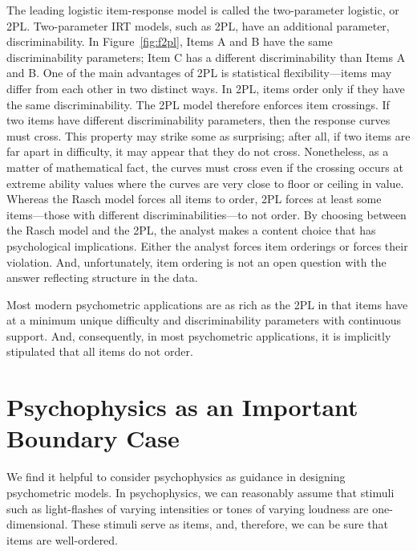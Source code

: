 \documentclass[english,,man]{apa6}
\begin{document}
The leading logistic item-response model is called the two-parameter logistic, or 2PL. Two-parameter IRT models, such as 2PL, have an additional parameter, discriminability. In Figure~\ref{fig:f2pl}, Items A and B have the same discriminability parameters; Item C has a different discriminability than Items A and B. One of the main advantages of 2PL is statistical flexibility---items may differ from each other in two distinct ways. In 2PL, items order only if they have the same discriminability. The 2PL model therefore enforces item crossings. If two items have different discriminability parameters, then the response curves must cross. This property may strike some as surprising; after all, if two items are far apart in difficulty, it may appear that they do not cross. Nonetheless, as a matter of mathematical fact, the curves must cross even if the crossing occurs at extreme ability values where the curves are very close to floor or ceiling in value. Whereas the Rasch model forces all items to order, 2PL forces at least some items---those with different discriminabilities---to not order. By choosing between the Rasch model and the 2PL, the analyst makes a content choice that has psychological implications. Either the analyst forces item orderings or forces their violation. And, unfortunately, item ordering is not an open question with the answer reflecting structure in the data.

Most modern psychometric applications are as rich as the 2PL in that items have at a minimum unique difficulty and discriminability parameters with continuous support. And, consequently, in most psychometric applications, it is implicitly stipulated that all items do not order.

\hypertarget{psychophysics-as-an-important-boundary-case}{%
\section{Psychophysics as an Important Boundary Case}\label{psychophysics-as-an-important-boundary-case}}

We find it helpful to consider psychophysics as guidance in designing psychometric models. In psychophysics, we can reasonably assume that stimuli such as light-flashes of varying intensities or tones of varying loudness are one-dimensional. These stimuli serve as items, and, therefore, we can be sure that items are well-ordered.
\end{document}
